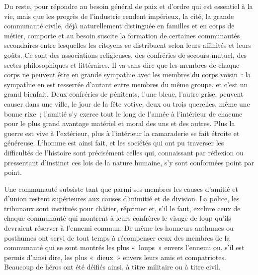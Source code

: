 \documentclass[french,twoside]{book} %
\newcommand{\astermono}{\medskip\centerline{\color{rubric}\large\selectfont{\syms ✻}}\medskip\par}%
\begin{document}
Du reste, pour répondre au besoin général de paix et d’ordre qui est essentiel à la vie, mais que les progrès de l’industrie rendent impérieux, la cité, la grande communauté civile, déjà naturellement distinguée en familles et en corps de métier, comporte et au besoin suscite la formation de certaines communautés secondaires entre lesquelles les citoyens se distribuent selon leurs affinités et leurs goûts. Ce sont des associations religieuses, des confréries de secours mutuel, des sectes philosophiques et littéraires. Il va sans dire que les membres de chaque corps ne peuvent être en grande sympathie avec les membres du corps voisin : la sympathie en est resserrée d’autant entre membres du même groupe, et c’est un grand bienfait. Deux confréries de pénitents, l’une bleue, l’autre grise, peuvent causer dans une ville, le jour de la fête votive, deux ou trois querelles, même une bonne rixe ; l’amitié s’y exerce tout le long de l’année à l’intérieur de chacune pour le plus grand avantage matériel et moral des uns et des autres. Plus la guerre est vive à l’extérieur, plus à l’intérieur la camaraderie se fait étroite et généreuse. L’homme est ainsi fait, et les sociétés qui ont pu traverser les difficultés de l’histoire sont précisément celles qui, connaissant par réflexion ou pressentant d’instinct ces lois de la nature humaine, s’y sont conformées point par point.\par
Une communauté subsiste tant que parmi ses membres les causes d’amitié et d’union restent supérieures aux causes d’inimitié et de division. La police, les tribunaux sont institués pour châtier, réprimer et, s’il le faut, exclure ceux de chaque communauté qui montrent à leurs confrères le visage de loup qu’ils devraient réserver à l’ennemi commun. De même les honneurs anthumes ou posthumes ont servi de tout temps à récompenser ceux des membres de la communauté qui se sont montrés les plus « loups » envers l’ennemi ou, s’il est permis d’ainsi dire, les plus « dieux » envers leurs amis et compatriotes. Beaucoup de héros ont été déifiés ainsi, à titre militaire ou à titre civil.\par

\astermono
\end{document}
